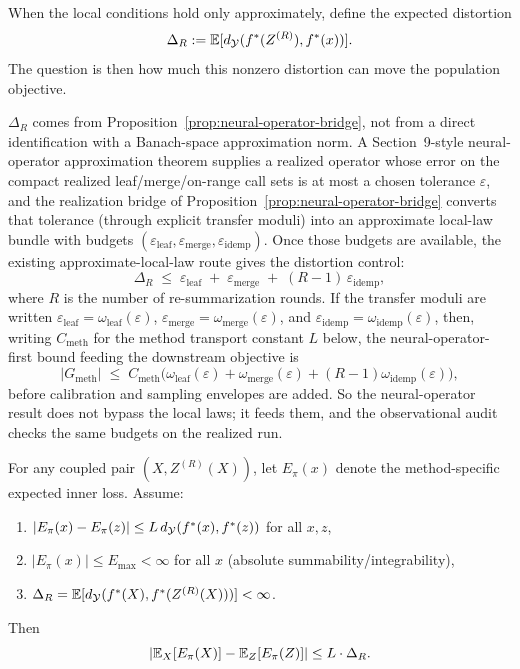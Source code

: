 When the local conditions hold only approximately, define the expected distortion
\[
\Delta_R := \mathbb{E}[d_{\mathcal{Y}}(f^\ast(Z^{(R)}), f^\ast(x))].
\]
The question is then how much this nonzero distortion can move the population objective.

$\Delta_R$ comes from Proposition~\ref{prop:neural-operator-bridge},
not from a direct identification with a Banach-space approximation
norm. A Section~9-style
neural-operator approximation theorem supplies a realized operator whose
error on the compact realized leaf/merge/on-range call sets is at most a
chosen tolerance $\varepsilon$, and the realization bridge of
Proposition~\ref{prop:neural-operator-bridge} converts that
tolerance (through explicit transfer moduli) into an approximate
local-law bundle with budgets
$(\varepsilon_{\mathrm{leaf}}, \varepsilon_{\mathrm{merge}},
\varepsilon_{\mathrm{idemp}})$. Once those budgets are available, the
existing approximate-local-law route gives the distortion control:
\[
\Delta_R \;\le\;
\varepsilon_{\mathrm{leaf}}
\;+\;
\varepsilon_{\mathrm{merge}}
\;+\;
(R-1)\,\varepsilon_{\mathrm{idemp}},
\]
where $R$ is the number of re-summarization rounds. If the transfer
moduli are written
$\varepsilon_{\mathrm{leaf}}=\omega_{\mathrm{leaf}}(\varepsilon)$,
$\varepsilon_{\mathrm{merge}}=\omega_{\mathrm{merge}}(\varepsilon)$, and
$\varepsilon_{\mathrm{idemp}}=\omega_{\mathrm{idemp}}(\varepsilon)$,
then, writing $C_{\mathrm{meth}}$ for the method transport constant $L$
below, the neural-operator-first bound feeding the downstream objective is
\[
|G_{\mathrm{meth}}|
\;\le\;
C_{\mathrm{meth}}\Big(
\omega_{\mathrm{leaf}}(\varepsilon)
+\omega_{\mathrm{merge}}(\varepsilon)
+(R-1)\omega_{\mathrm{idemp}}(\varepsilon)
\Big),
\]
before calibration and sampling envelopes are added. So the
neural-operator result does not bypass the local laws; it feeds them,
and the observational audit checks the same budgets on the realized run.

\begin{theorem}\label{thm:unified-gap}
For any coupled pair $(X, Z^{(R)}(X))$, let $E_\pi(x)$ denote the method-specific expected inner loss. Assume:
\begin{enumerate}[nosep]
\item $|E_\pi(x)-E_\pi(z)| \le L\,d_{\mathcal{Y}}(f^\ast(x),f^\ast(z))$ for all $x,z$,
\item $|E_\pi(x)| \le E_{\max} < \infty$ for all $x$ (absolute summability/integrability),
\item $\Delta_R = \mathbb{E}[d_{\mathcal{Y}}(f^\ast(X),f^\ast(Z^{(R)}(X)))] < \infty$.
\end{enumerate}
Then
\[
\left| \mathbb{E}_X[E_\pi(X)] - \mathbb{E}_Z[E_\pi(Z)] \right| \le L \cdot \Delta_R.
\]
\end{theorem}

